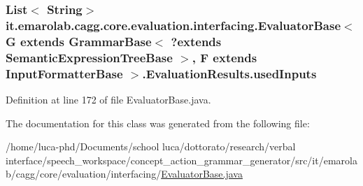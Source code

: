 \hypertarget{classit_1_1emarolab_1_1cagg_1_1core_1_1evaluation_1_1interfacing_1_1EvaluatorBase_3_01G_01extend2adbebed3b043f34edcb0efa646badc7_a939fede306e58fa5a0c945086e49dba3}{
\subsubsection[{used\-Inputs}]{\setlength{\rightskip}{0pt plus 5cm}List$<$ String$>$ it.\-emarolab.\-cagg.\-core.\-evaluation.\-interfacing.\-Evaluator\-Base$<$ G extends Grammar\-Base$<$ ?extends {\bf Semantic\-Expression\-Tree\-Base} $>$, F extends {\bf Input\-Formatter\-Base} $>$.Evaluation\-Results.\-used\-Inputs\hspace{0.3cm}{\ttfamily [private]}}}\label{classit_1_1emarolab_1_1cagg_1_1core_1_1evaluation_1_1interfacing_1_1EvaluatorBase_3_01G_01extend2adbebed3b043f34edcb0efa646badc7_a939fede306e58fa5a0c945086e49dba3}


Definition at line 172 of file Evaluator\-Base.\-java.



The documentation for this class was generated from the following file\-:\begin{DoxyCompactItemize}
\item 
/home/luca-\/phd/\-Documents/school luca/dottorato/research/verbal interface/speech\-\_\-workspace/concept\-\_\-action\-\_\-grammar\-\_\-generator/src/it/emarolab/cagg/core/evaluation/interfacing/\hyperlink{EvaluatorBase_8java}{Evaluator\-Base.\-java}\end{DoxyCompactItemize}
